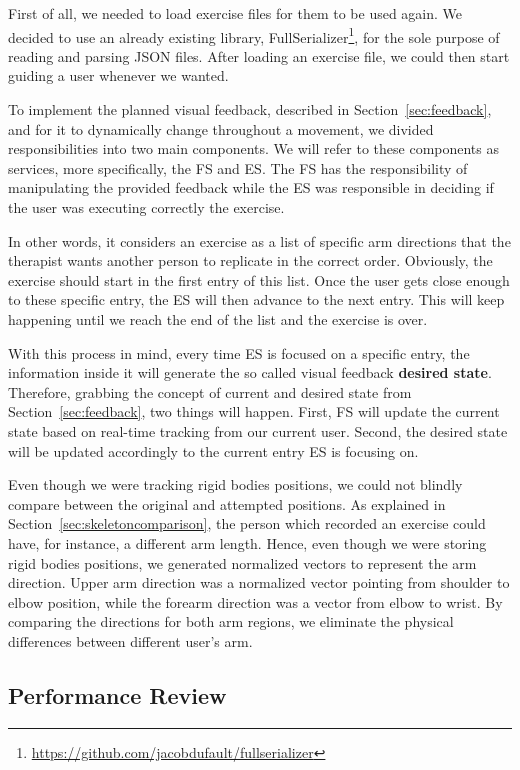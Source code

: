 First of all, we needed to load exercise files for them to be used again. 
We decided to use an already existing library, FullSerializer\footnote{\url{https://github.com/jacobdufault/fullserializer}}, for the sole purpose of reading and parsing JSON files.
After loading an exercise file, we could then start guiding a user whenever we wanted.

To implement the planned visual feedback, described in Section~\ref{sec:feedback}, and for it to dynamically change throughout a movement, 
we divided responsibilities into two main components. We will refer to these components as services, more specifically, the \ac{FS} and \ac{ES}.
The \ac{FS} has the responsibility of manipulating the provided feedback while the \ac{ES} was responsible in deciding if the user was executing correctly the exercise.

In other words, it considers an exercise as a list of specific arm directions that the therapist wants another person to replicate in the correct order. 
Obviously, the exercise should start in the first entry of this list. 
Once the user gets close enough to these specific entry, the \ac{ES} will then advance to the next entry. 
This will keep happening until we reach the end of the list and the exercise is over.

With this process in mind, every time \ac{ES} is focused on a specific entry, the information inside it will generate the so called visual feedback \textbf{desired state}. 
Therefore, grabbing the concept of current and desired state from Section~\ref{sec:feedback}, two things will happen. 
First, \ac{FS} will update the current state based on real-time tracking from our current user. 
Second, the desired state will be updated accordingly to the current entry \ac{ES} is focusing on.

Even though we were tracking rigid bodies positions, we could not blindly compare between the original and attempted positions.
As explained in Section~\ref{sec:skeletoncomparison}, the person which recorded an exercise could have, for instance, a different arm length. Hence, even though we were storing rigid bodies positions, we generated normalized vectors to represent the arm direction. 
Upper arm direction was a normalized vector pointing from shoulder to elbow position, while the forearm direction was a vector from elbow to wrist.
By comparing the directions for both arm regions, we eliminate the physical differences between different user's arm.

\subsection{Performance Review}

